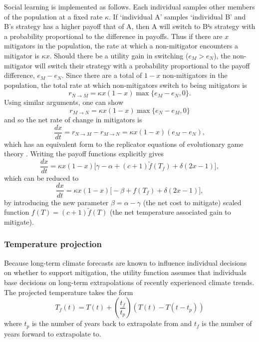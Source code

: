 \documentclass[10pt,letterpaper]{article}
\providecommand{\DIFaddtex}[1]{{\protect\color{blue}\uwave{#1}}} %
\providecommand{\DIFdeltex}[1]{{\protect\color{red}\sout{#1}}}                      %
\providecommand{\DIFaddbegin}{} %
\providecommand{\DIFaddend}{} %
\providecommand{\DIFdelbegin}{} %
\providecommand{\DIFdelend}{} %
\providecommand{\DIFadd}[1]{\texorpdfstring{\DIFaddtex{#1}}{#1}} %
\providecommand{\DIFdel}[1]{\texorpdfstring{\DIFdeltex{#1}}{}} %
\begin{document}
Social learning is implemented as follows. Each individual samples other members of the population at a fixed rate $\kappa$. If `individual A' samples `individual B' and B's strategy has a higher payoff that of A, then A will switch to B\DIFdelbegin \DIFdel{’}\DIFdelend \DIFaddbegin \DIFadd{?}\DIFaddend s strategy with a probability proportional to the difference in payoffs. Thus if there are $x$ mitigators in the population, the rate at which a non-mitigator encounters a mitigator is $\kappa x$. Should there be a utility gain in switching ($e_M>e_N$), the non-mitigator will switch their strategy with a probability proportional to the payoff difference, $e_M-e_N$. Since there are a total of $1-x$ non-mitigators in the population, the total rate at which non-mitigators switch to being mitigators is
\begin{equation}
r_{N\to M} = \kappa x(1-x) \max \{e_M-e_N,0 \}.
\end{equation}
Using similar arguments, one can show
\begin{equation}
r_{M\to N} = \kappa x(1-x) \max \{e_N-e_M,0 \}
\end{equation}
and so the net rate of change in mitigators is
\begin{equation}
\frac{dx}{dt} = r_{N\to M} - r_{M \to N} = \kappa x(1-x)(e_M-e_N),
\end{equation}
which has an equivalent form to the replicator equations of evolutionary game theory \cite{hofbauer98}. Writing the payoff functions explicitly gives
\begin{equation}
\frac{dx}{dt} = \kappa x (1-x) \big[ \gamma-\alpha + (c+1)\tilde{f}(T_f) + \delta(2x-1)\big],
\end{equation}
which can be reduced to
\begin{equation}
\label{eq:model_x}
\frac{dx}{dt} = \kappa x (1-x) \big[ -\beta + f(T_f) + \delta(2x-1)\big],
\end{equation}
by introducing the new parameter $\beta = \alpha-\gamma$ (the net cost to mitigate) scaled function $f(T) = (c+1)\tilde{f}(T)$ (the net temperature associated gain to mitigate).


\subsubsection*{Temperature projection} Because long-term climate forecasts are known to influence individual decisions on whether to support mitigation\cite{weber10}, the utility function assumes that individuals base decisions on long-term extrapolations of recently experienced climate trends. The projected temperature takes the form
\begin{equation}
T_f(t) = T(t) + \left(\frac{t_f}{t_p}\right) (T(t)-T(t-t_p)) 
\end{equation}
where $t_p$ is the number of years back to extrapolate from and $t_f$ is the number of years forward to extrapolate to.
\end{document}
